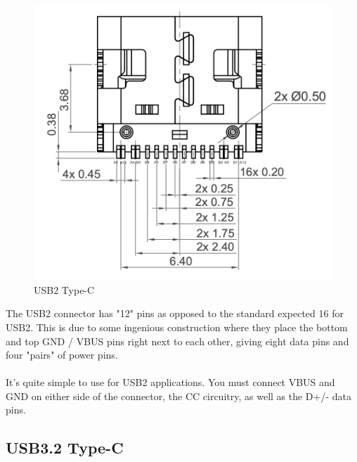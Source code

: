\documentclass[12pt]{article}
\begin{document}
\begin{figure}[h]
	\centering
	\includegraphics[width=.8\linewidth]{images/GCT-USB2-Type-C.png}
	\caption{USB2 Type-C\protect\footnotemark}
	\label{fig:usb-c-pinout-usb2-gct}
\end{figure}


\noindent
The USB2 connector has "12" pins as opposed to the standard expected 16 for USB2. This is due to some ingenious construction where they place the bottom and top GND / VBUS pins right next to each other, giving eight data pins and four "pairs" of power pins.\\\\
\noindent
It's quite simple to use for USB2 applications. You must connect VBUS and GND on either side of the connector, the CC circuitry, as well as the D+/- data pins.



\newpage

\subsection{USB3.2 Type-C}
\end{document}

